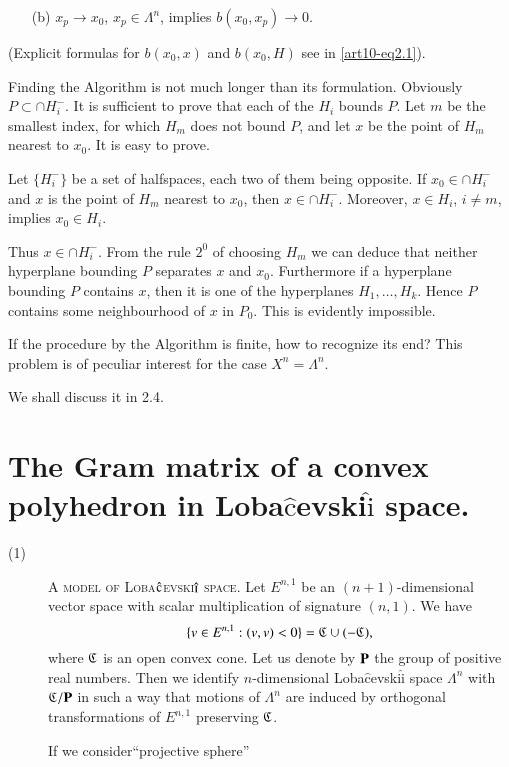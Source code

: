 \begin{description}
\begin{itemize}
\item[(b)] $x_p \to x_0$, $x_p \in \Lambda^n$, implies $b(x_0 , x_p) \to 0$. 
\end{itemize}

(Explicit formulas for $b (x_0, x)$ and $b(x_0, H)$ see in \ref{art10-eq2.1}).

Finding the Algorithm is not much longer than its formulation. Obviously $P\subset \cap H^-_i$. It is sufficient to prove that each of the $H_i$ bounds $P$. Let $m$ be the smallest index, for which $H_m$ does not bound $P$, and let $x$ be the point of $H_m$ nearest to $x_0$. It is easy to prove.
\end{description}

\begin{lemma}\label{art10-lem1.4}
Let $\{H^-_i\}$ be a set of halfspaces, each two of them being opposite. If $x_0 \in \cap H^-_i$ and $x$ is the point of $H_m$ nearest to $x_0$, then $x \in \cap H^-_i$. Moreover, $x \in H_i$, $i \neq m$, implies $x_0 \in H_i$.
\end{lemma}

Thus $x \in \cap H^-_i$. From the rule $2^0$ of choosing $H_m$ we can deduce that neither hyperplane bounding $P$ separates $x$ and $x_0$. Furthermore if a hyperplane bounding $P$ contains $x$, then it is one of the hyperplanes $H_1,\ldots, H_k$. Hence $P$ contains some neighbourhood of $x$ in $P_0$. This is evidently impossible.

If the procedure by the Algorithm is finite, how to recognize its end? This problem is of peculiar interest for the case $X^n = \Lambda^n$.

We shall discuss it in 2.4.

\section{The Gram matrix of a convex polyhedron in Loba$\hat{\text{c}}$evski$\hat{\text{i}}$ space.}\label{art10-sec2}

\begin{description}
\item[(1)] A \textsc{model of Loba$\hat{\textsc{c}}$evski$\hat{\textsc{i}}$ space.} Let $E^{n,1}$ be an $(n+1)$-dimensional vector space with scalar multiplication of signature $(n,1)$. We have
$$
\{v \in E^{n,1}: (v, v) < 0\} = \mathfrak{C} \cup (-\mathfrak{C}),
$$
where $\mathfrak{C}$ is an open convex cone. Let us denote by $\mathbf{P}$ the group of positive real numbers. Then we identify $n$-dimensional Loba$\hat{\text{c}}$evski$\hat{\text{i}}$ space $\Lambda^n$ with$\mathfrak{C}/\mathbf{P}$ in such a way that motions of $\Lambda^n$ are induced by orthogonal transformations of $E^{n,1}$ preserving $\mathfrak{C}$.

If we consider\pageoriginale ``projective sphere'' 
\end{description}




